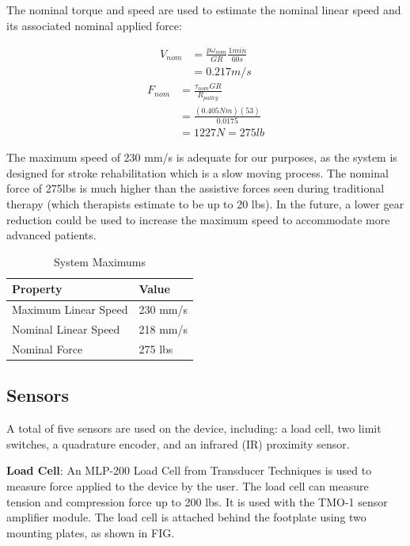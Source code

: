 \documentclass[12pt]{report}
\begin{document}
	The nominal torque and speed are used to estimate the nominal linear speed and its associated nominal applied force:
	
	\begin{align*}
		V_{nom} &= \frac{p\omega _{nom}}{GR} \frac{1min}{60s} \\
		&= 0.217 m/s
	\end{align*}
	\begin{align*}
		F_{nom} &= \frac{\tau _{nom}GR}{R_{pulley}} \\
		&= \frac{(0.405Nm)(53)}{0.0175} \\
		&= 1227N = 275 lb
	\end{align*}

The maximum speed of 230 mm/s is adequate for our purposes, as the system is designed for stroke rehabilitation which is a slow moving process. The nominal force of 275lbs is much higher than the assistive forces seen during traditional therapy (which therapists estimate to be up to 20 lbs). In the future, a lower gear reduction could be used to increase the maximum speed to accommodate more advanced patients.

	\begin{table}[h]
	\centering
	\caption{System Maximums}	
	\begin{tabular}{|l|l|}
		\hline
		\rowcolor{gray!10} \textbf{Property} & \textbf{Value}  \\ \hline
 		Maximum Linear Speed & 230 mm/s \\ \hline
 		Nominal Linear Speed & 218 mm/s \\ \hline
 		Nominal Force & 275 lbs \\ \hline
		\end{tabular}
	\label{tab:gear}
	\end{table}		
		
		
		\subsection{Sensors}

	A total of five sensors are used on the device, including: a load cell, two limit switches, a quadrature encoder, and an infrared (IR) proximity sensor. 
	
	\textbf{Load Cell}: An MLP-200 Load Cell from Transducer Techniques is used to measure force applied to the device by the user. The load cell can measure tension and compression force up to 200 lbs. It is used with the TMO-1 sensor amplifier module. The load cell is attached behind the footplate using two mounting plates, as shown in FIG. 
	
\end{document}
